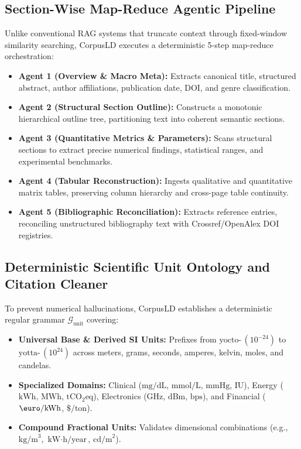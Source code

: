 \documentclass[conference]{IEEEtran}
\begin{document}
\subsection{Section-Wise Map-Reduce Agentic Pipeline}
Unlike conventional RAG systems that truncate context through fixed-window similarity searching, CorpusLD executes a deterministic 5-step map-reduce orchestration:
\begin{itemize}
    \item \textbf{Agent 1 (Overview \& Macro Meta):} Extracts canonical title, structured abstract, author affiliations, publication date, DOI, and genre classification.
    \item \textbf{Agent 2 (Structural Section Outline):} Constructs a monotonic hierarchical outline tree, partitioning text into coherent semantic sections.
    \item \textbf{Agent 3 (Quantitative Metrics \& Parameters):} Scans structural sections to extract precise numerical findings, statistical ranges, and experimental benchmarks.
    \item \textbf{Agent 4 (Tabular Reconstruction):} Ingests qualitative and quantitative matrix tables, preserving column hierarchy and cross-page table continuity.
    \item \textbf{Agent 5 (Bibliographic Reconciliation):} Extracts reference entries, reconciling unstructured bibliography text with Crossref/OpenAlex DOI registries.
\end{itemize}

\subsection{Deterministic Scientific Unit Ontology and Citation Cleaner}
To prevent numerical hallucinations, CorpusLD establishes a deterministic regular grammar $\mathcal{G}_{\text{unit}}$ covering:
\begin{itemize}
    \item \textbf{Universal Base \& Derived SI Units:} Prefixes from $\text{yocto-} \, (10^{-24})$ to $\text{yotta-} \, (10^{24})$ across meters, grams, seconds, amperes, kelvin, moles, and candelas.
    \item \textbf{Specialized Domains:} Clinical ($\text{mg/dL}$, $\text{mmol/L}$, $\text{mmHg}$, $\text{IU}$), Energy ($\text{kWh}$, $\text{MWh}$, $\text{tCO}_2\text{eq}$), Electronics ($\text{GHz}$, $\text{dBm}$, $\text{bps}$), and Financial ($\text{\euro/kWh}$, $\text{\$/ton}$).
    \item \textbf{Compound Fractional Units:} Validates dimensional combinations (e.g., $\text{kg/m}^3$, $\text{kW}\cdot\text{h/year}$, $\text{cd/m}^2$).
\end{itemize}
\end{document}
